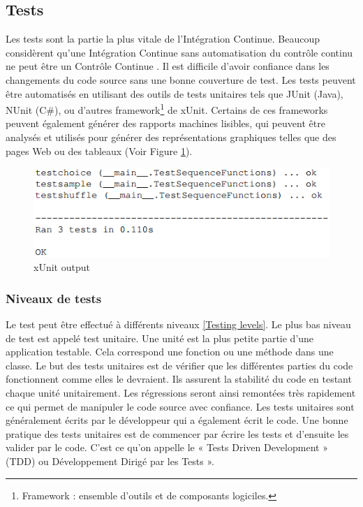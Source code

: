 \documentclass{report}
\begin{document}
      \subsection{Tests}
      Les tests sont la partie la plus vitale de l’Intégration Continue. Beaucoup considèrent qu’une Intégration Continue sans automatisation du contrôle continu ne peut être un Contrôle Continue \cite{Duv07}. Il est difficile d'avoir confiance dans les changements du code source sans une bonne couverture de test. Les tests peuvent être automatisés en utilisant des outils de tests unitaires tels que JUnit (Java), NUnit (C\#), ou d'autres framework\footnote{Framework : ensemble d'outils et de composants logiciles.} de xUnit. Certains de ces frameworks peuvent également générer des rapports machines lisibles, qui peuvent être analysés et utilisés pour générer des représentations graphiques telles que des pages Web ou des tableaux (Voir Figure \ref{xUnit output}).

      \begin{figure}
        \begin{center}
          \includegraphics[scale=0.8]{images/tests.png}
        \end{center}
        \caption{xUnit output}
        \label{xUnit output}
      \end{figure}

        \subsubsection{Niveaux de tests}
        Le test peut être effectué à différents niveaux \ref{Testing levels}. Le plus bas niveau de test est appelé test unitaire. Une unité est la plus petite partie d’une application testable. Cela correspond une fonction ou une méthode dans une classe. Le but des tests unitaires est de vérifier que les différentes parties du code fonctionnent comme elles le devraient. Ils assurent la stabilité du code en testant chaque unité unitairement. Les régressions seront ainsi remontées très rapidement ce qui permet de manipuler le code source avec confiance. Les tests unitaires sont généralement écrits par le développeur qui a également écrit le code. Une bonne pratique des tests unitaires est de commencer par écrire les tests et d’ensuite les valider par le code. C’est ce qu’on appelle le « Tests Driven Development » (TDD) ou Développement Dirigé par les Tests ».\\
\end{document}
